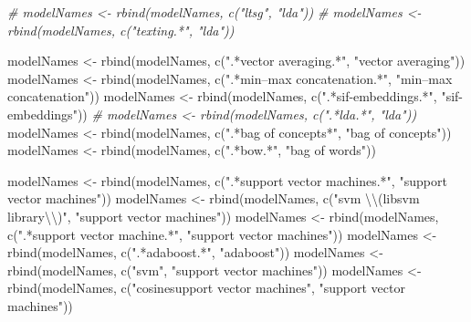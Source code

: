 \documentclass[
]{article}
\newenvironment{Shaded}{\begin{snugshade}}{\end{snugshade}}
\newcommand{\CommentTok}[1]{\textcolor[rgb]{0.56,0.35,0.01}{\textit{#1}}}
\newcommand{\FunctionTok}[1]{\textcolor[rgb]{0.00,0.00,0.00}{#1}}
\newcommand{\NormalTok}[1]{#1}
\newcommand{\OtherTok}[1]{\textcolor[rgb]{0.56,0.35,0.01}{#1}}
\newcommand{\SpecialCharTok}[1]{\textcolor[rgb]{0.00,0.00,0.00}{#1}}
\newcommand{\StringTok}[1]{\textcolor[rgb]{0.31,0.60,0.02}{#1}}
\begin{document}
\begin{Shaded}
\begin{Highlighting}[]
\CommentTok{\# modelNames \textless{}{-} rbind(modelNames, c("ltsg", "lda"))}
\CommentTok{\# modelNames \textless{}{-} rbind(modelNames, c("texting.*", "lda"))}

\NormalTok{modelNames }\OtherTok{\textless{}{-}} \FunctionTok{rbind}\NormalTok{(modelNames, }\FunctionTok{c}\NormalTok{(}\StringTok{".*vector averaging.*"}\NormalTok{, }\StringTok{"vector averaging"}\NormalTok{))}
\NormalTok{modelNames }\OtherTok{\textless{}{-}} \FunctionTok{rbind}\NormalTok{(modelNames, }\FunctionTok{c}\NormalTok{(}\StringTok{".*min–max concatenation.*"}\NormalTok{, }\StringTok{"min–max concatenation"}\NormalTok{))}
\NormalTok{modelNames }\OtherTok{\textless{}{-}} \FunctionTok{rbind}\NormalTok{(modelNames, }\FunctionTok{c}\NormalTok{(}\StringTok{".*sif{-}embeddings.*"}\NormalTok{, }\StringTok{"sif{-}embeddings"}\NormalTok{))}
\CommentTok{\# modelNames \textless{}{-} rbind(modelNames, c(".*lda.*", "lda"))}
\NormalTok{modelNames }\OtherTok{\textless{}{-}} \FunctionTok{rbind}\NormalTok{(modelNames, }\FunctionTok{c}\NormalTok{(}\StringTok{".*bag of concepts*"}\NormalTok{, }\StringTok{"bag of concepts"}\NormalTok{))}
\NormalTok{modelNames }\OtherTok{\textless{}{-}} \FunctionTok{rbind}\NormalTok{(modelNames, }\FunctionTok{c}\NormalTok{(}\StringTok{".*bow.*"}\NormalTok{, }\StringTok{"bag of words"}\NormalTok{))}

\NormalTok{modelNames }\OtherTok{\textless{}{-}} \FunctionTok{rbind}\NormalTok{(modelNames, }\FunctionTok{c}\NormalTok{(}\StringTok{".*support vector machines.*"}\NormalTok{, }\StringTok{"support vector machines"}\NormalTok{))}
\NormalTok{modelNames }\OtherTok{\textless{}{-}} \FunctionTok{rbind}\NormalTok{(modelNames, }\FunctionTok{c}\NormalTok{(}\StringTok{"svm }\SpecialCharTok{\textbackslash{}\textbackslash{}}\StringTok{(libsvm library}\SpecialCharTok{\textbackslash{}\textbackslash{}}\StringTok{)"}\NormalTok{, }\StringTok{"support vector machines"}\NormalTok{))}
\NormalTok{modelNames }\OtherTok{\textless{}{-}} \FunctionTok{rbind}\NormalTok{(modelNames, }\FunctionTok{c}\NormalTok{(}\StringTok{".*support vector machine.*"}\NormalTok{, }\StringTok{"support vector machines"}\NormalTok{))}
\NormalTok{modelNames }\OtherTok{\textless{}{-}} \FunctionTok{rbind}\NormalTok{(modelNames, }\FunctionTok{c}\NormalTok{(}\StringTok{".*adaboost.*"}\NormalTok{, }\StringTok{"adaboost"}\NormalTok{))}
\NormalTok{modelNames }\OtherTok{\textless{}{-}} \FunctionTok{rbind}\NormalTok{(modelNames, }\FunctionTok{c}\NormalTok{(}\StringTok{"svm"}\NormalTok{, }\StringTok{"support vector machines"}\NormalTok{))}
\NormalTok{modelNames }\OtherTok{\textless{}{-}} \FunctionTok{rbind}\NormalTok{(modelNames, }\FunctionTok{c}\NormalTok{(}\StringTok{"cosinesupport vector machines"}\NormalTok{, }\StringTok{"support vector machines"}\NormalTok{))}


\end{Highlighting}
\end{Shaded}
\end{document}

